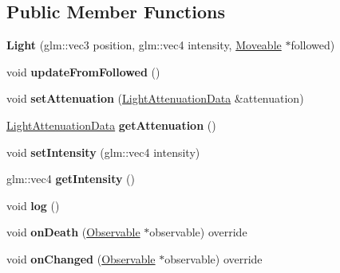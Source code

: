 \subsection*{Public Member Functions}
\begin{DoxyCompactItemize}
\item 
{\bfseries Light} (glm\+::vec3 position, glm\+::vec4 intensity, \hyperlink{classflw_1_1flf_1_1Moveable}{Moveable} $\ast$followed)\hypertarget{classflw_1_1flf_1_1Light_a36084a4a54fad153bf47c7c3c4759809}{}\label{classflw_1_1flf_1_1Light_a36084a4a54fad153bf47c7c3c4759809}

\item 
void {\bfseries update\+From\+Followed} ()\hypertarget{classflw_1_1flf_1_1Light_a66488fb86f264c9b9235880f43068d79}{}\label{classflw_1_1flf_1_1Light_a66488fb86f264c9b9235880f43068d79}

\item 
void {\bfseries set\+Attenuation} (\hyperlink{structflw_1_1flf_1_1LightAttenuationData}{Light\+Attenuation\+Data} \&attenuation)\hypertarget{classflw_1_1flf_1_1Light_a36e8aa7f8645aefb2ab4ec6d54895158}{}\label{classflw_1_1flf_1_1Light_a36e8aa7f8645aefb2ab4ec6d54895158}

\item 
\hyperlink{structflw_1_1flf_1_1LightAttenuationData}{Light\+Attenuation\+Data} {\bfseries get\+Attenuation} ()\hypertarget{classflw_1_1flf_1_1Light_aa057776a1eb1796978ebcd334574f1de}{}\label{classflw_1_1flf_1_1Light_aa057776a1eb1796978ebcd334574f1de}

\item 
void {\bfseries set\+Intensity} (glm\+::vec4 intensity)\hypertarget{classflw_1_1flf_1_1Light_a1d8e6e0e191a3c47a3ea87a62445d89c}{}\label{classflw_1_1flf_1_1Light_a1d8e6e0e191a3c47a3ea87a62445d89c}

\item 
glm\+::vec4 {\bfseries get\+Intensity} ()\hypertarget{classflw_1_1flf_1_1Light_aadb91107eef0e1e24363a2b757e649e1}{}\label{classflw_1_1flf_1_1Light_aadb91107eef0e1e24363a2b757e649e1}

\item 
void {\bfseries log} ()\hypertarget{classflw_1_1flf_1_1Light_ac5313d3d1b9a37f486aae0de56bccaa0}{}\label{classflw_1_1flf_1_1Light_ac5313d3d1b9a37f486aae0de56bccaa0}

\item 
void {\bfseries on\+Death} (\hyperlink{classflw_1_1flf_1_1Observable}{Observable} $\ast$observable) override\hypertarget{classflw_1_1flf_1_1Light_a818069ca94cb8932324eea986146a7f0}{}\label{classflw_1_1flf_1_1Light_a818069ca94cb8932324eea986146a7f0}

\item 
void {\bfseries on\+Changed} (\hyperlink{classflw_1_1flf_1_1Observable}{Observable} $\ast$observable) override\hypertarget{classflw_1_1flf_1_1Light_a150573245975df8e0e436f590c85d239}{}\label{classflw_1_1flf_1_1Light_a150573245975df8e0e436f590c85d239}

\end{DoxyCompactItemize}
